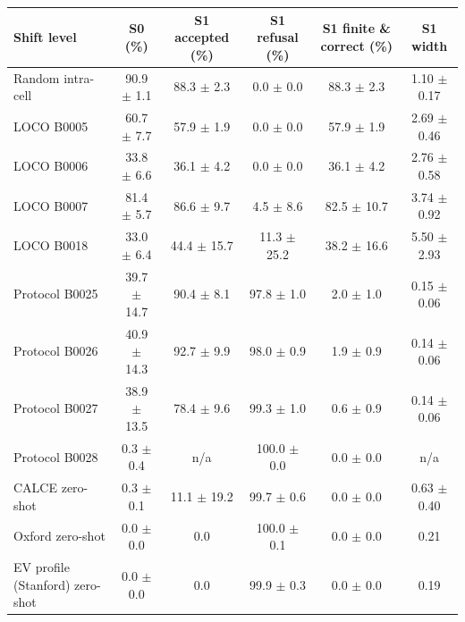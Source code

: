 \begin{tabular}{lccccc}
\toprule
Shift level & S0 (\%) & S1 accepted (\%) & S1 refusal (\%) & S1 finite \& correct (\%) & S1 width \\
\midrule
Random intra-cell & 90.9 $\pm$ 1.1 & 88.3 $\pm$ 2.3 & 0.0 $\pm$ 0.0 & 88.3 $\pm$ 2.3 & 1.10 $\pm$ 0.17 \\
LOCO B0005 & 60.7 $\pm$ 7.7 & 57.9 $\pm$ 1.9 & 0.0 $\pm$ 0.0 & 57.9 $\pm$ 1.9 & 2.69 $\pm$ 0.46 \\
LOCO B0006 & 33.8 $\pm$ 6.6 & 36.1 $\pm$ 4.2 & 0.0 $\pm$ 0.0 & 36.1 $\pm$ 4.2 & 2.76 $\pm$ 0.58 \\
LOCO B0007 & 81.4 $\pm$ 5.7 & 86.6 $\pm$ 9.7 & 4.5 $\pm$ 8.6 & 82.5 $\pm$ 10.7 & 3.74 $\pm$ 0.92 \\
LOCO B0018 & 33.0 $\pm$ 6.4 & 44.4 $\pm$ 15.7 & 11.3 $\pm$ 25.2 & 38.2 $\pm$ 16.6 & 5.50 $\pm$ 2.93 \\
Protocol B0025 & 39.7 $\pm$ 14.7 & 90.4 $\pm$ 8.1 & 97.8 $\pm$ 1.0 & 2.0 $\pm$ 1.0 & 0.15 $\pm$ 0.06 \\
Protocol B0026 & 40.9 $\pm$ 14.3 & 92.7 $\pm$ 9.9 & 98.0 $\pm$ 0.9 & 1.9 $\pm$ 0.9 & 0.14 $\pm$ 0.06 \\
Protocol B0027 & 38.9 $\pm$ 13.5 & 78.4 $\pm$ 9.6 & 99.3 $\pm$ 1.0 & 0.6 $\pm$ 0.9 & 0.14 $\pm$ 0.06 \\
Protocol B0028 & 0.3 $\pm$ 0.4 & n/a & 100.0 $\pm$ 0.0 & 0.0 $\pm$ 0.0 & n/a \\
CALCE zero-shot & 0.3 $\pm$ 0.1 & 11.1 $\pm$ 19.2 & 99.7 $\pm$ 0.6 & 0.0 $\pm$ 0.0 & 0.63 $\pm$ 0.40 \\
Oxford zero-shot & 0.0 $\pm$ 0.0 & 0.0 & 100.0 $\pm$ 0.1 & 0.0 $\pm$ 0.0 & 0.21 \\
EV profile (Stanford) zero-shot & 0.0 $\pm$ 0.0 & 0.0 & 99.9 $\pm$ 0.3 & 0.0 $\pm$ 0.0 & 0.19 \\
\bottomrule
\end{tabular}
